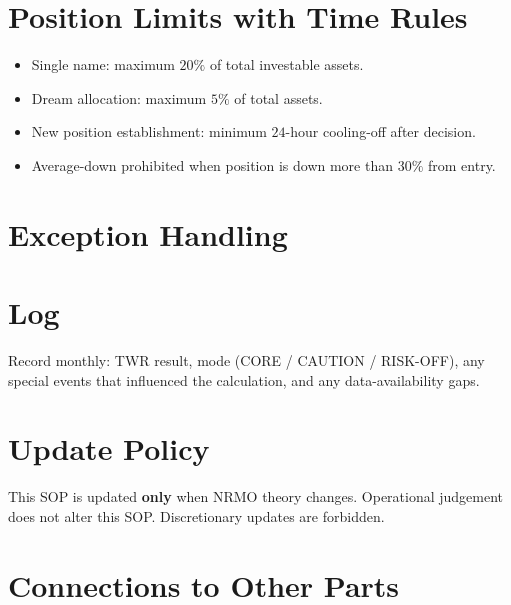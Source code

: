 \section{Position Limits with Time Rules}
\label{sec:invest-position-limits}

\begin{itemize}
\item Single name: maximum $20\%$ of total investable assets.
\item Dream allocation: maximum $5\%$ of total assets.
\item New position establishment: minimum $24$-hour cooling-off
after decision.
\item Average-down prohibited when position is down more than $30\%$
from entry.
\end{itemize}

\section{Exception Handling}
\label{sec:invest-exceptions}


\section{Log}
\label{sec:invest-log}

Record monthly: TWR result, mode (CORE / CAUTION / RISK-OFF), any
special events that influenced the calculation, and any
data-availability gaps.

\section{Update Policy}
\label{sec:invest-update}

This SOP is updated \textbf{only} when NRMO theory changes.
Operational judgement does not alter this SOP. Discretionary updates
are forbidden.

\section*{Connections to Other Parts}

